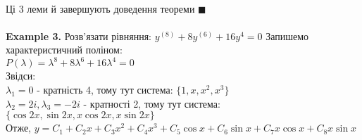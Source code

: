 \documentclass[a4paper, 14pt]{extarticle}
\def\bigline{\vspace{5mm}\\}
\def\qed{$\blacksquare$}
\begin{document}
\\
Ці 3 леми й завершують доведення теореми \qed
\\
\bigline
\textbf{Example 3.} Розв'язати рівняння: $y^{(8)}+8y^{(6)}+16y^{4} = 0$
Запишемо характеристичний поліном:\\
$P(\lambda) = \lambda^8 + 8 \lambda^6 + 16 \lambda^4 = 0$\\
Звідси:\\
$\lambda_1 = 0$ - кратність 4, тому тут система: $\{1, x, x^2, x^3\}$\\
$\lambda_2 = 2i, \lambda_3 = -2i$ - кратності 2, тому тут система: $\{\cos 2x, \sin 2x, x \cos 2x, x \sin 2x \}$\\
Отже, $y = C_1 + C_2 x + C_3 x^2 + C_4 x^3 + C_5 \cos x + C_6 \sin x + C_7 x \cos x + C_8 x \sin x$\\
\end{document}
